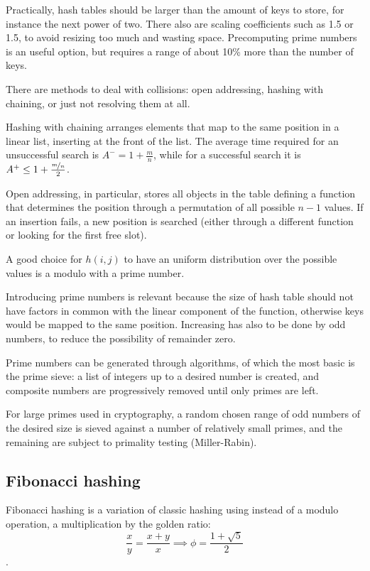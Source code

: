Practically, hash tables should be larger than the amount of keys to store, for instance the next power of two. There also are scaling coefficients such as 1.5 or 1.5, to avoid resizing too much and wasting space. Precomputing prime numbers is an useful option, but requires a range of about 10\% more than the number of keys.

There are methods to deal with collisions: open addressing, hashing with chaining, or just not resolving them at all.

Hashing with chaining arranges elements that map to the same position in a linear list, inserting at the front of the list. The average time required for an unsuccessful search is $A^- = 1 + \frac{m}{n}$, while for a successful search it is $A^+ \leq 1 + \frac{\nicefrac{m}{n}}{2}$.

Open addressing, in particular, stores all objects in the table defining a function that determines the position through a permutation of all possible $n - 1$ values. If an insertion fails, a new position is searched (either through a different function or looking for the first free slot).

A good choice for $h(i, j)$ to have an uniform distribution over the possible values is a modulo with a prime number.

Introducing prime numbers is relevant because the size of hash table should not have factors in common with the linear component of the function, otherwise keys would be mapped to the same position. Increasing has also to be done by odd numbers, to reduce the possibility of remainder zero.

Prime numbers can be generated through algorithms, of which the most basic is the prime sieve: a list of integers up to a desired number is created, and composite numbers are progressively removed until only primes are left. 

For large primes used in cryptography, a random chosen range of odd numbers of the desired size is sieved against a number of relatively small primes, and the remaining are subject to primality testing (Miller-Rabin).

\subsection{Fibonacci hashing}
Fibonacci hashing is a variation of classic hashing using instead of a modulo operation, a multiplication by the golden ratio:
$$\frac{x}{y} = \frac{x + y}{x} \implies \phi = \frac{1 + \sqrt{5}}{2}$$.

